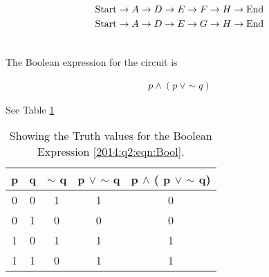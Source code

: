 \begin{subquestions}
\begin{subsubquestions}
\begin{align}
	\text{Start} \rightarrow A \rightarrow D \rightarrow E \rightarrow F \rightarrow H \rightarrow \text{End} \nonumber \\
	\text{Start} \rightarrow A \rightarrow D \rightarrow E \rightarrow G \rightarrow H \rightarrow \text{End} \nonumber \\ \nonumber
\end{align}
	
\end{subsubquestions}


\subquestion
\begin{subsubquestions}
	
\subsubquestion

The Boolean expression for the circuit is 

\begin{align}
	p \wedge (p \: \vee \sim q) \label{2014:q2:eqn:Bool}
\end{align}

\subsubquestion

See Table \ref{2014:tab:TrthTab}

\begin{table}[ht]
	\centering
	\begin{tabular}{|c|c|c|c|c|}
		\hline
		p&q& $\sim$ q & p $\vee$ $\sim$ q& p $\wedge$ ( p $\vee$ $\sim$ q) \\
		\hline
		0&0&1&1&0 \\
		0&1&0&0&0 \\
		1&0&1&1&1 \\
		1&1&0&1&1 \\
		\hline
	\end{tabular}
	\caption{\label{2014:tab:TrthTab} Showing the Truth values for the Boolean Expression \ref{2014:q2:eqn:Bool}.}
\end{table}

\end{subsubquestions}

\end{subquestions}
